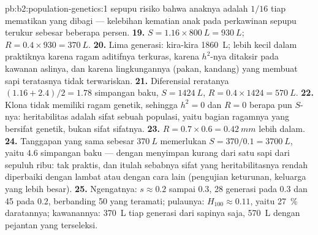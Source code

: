 \begin{solution}{pb:b2:population-genetics:1}
sepupu risiko bahwa anaknya  adalah $1/16$ tiap  mematikan
yang dibagi --- kelebihan kematian anak pada perkawinan sepupu terukur
sebesar beberapa persen.
\textbf{19.} $S = 1.16\times \qty{800}{L} = \qty{930}{L}$; $R = 0.4\times
930 = \qty{370}{L}$.
\textbf{20.} Lima generasi: kira-kira \qty{1860}{L}; lebih kecil dalam
praktiknya karena ragam aditifnya terkuras, karena $h^{2}$-nya ditaksir
pada kawanan aslinya, dan karena lingkungannya (pakan, kandang) yang
membuat sapi teratasnya tidak terwariskan.
\textbf{21.} Diferensial reratanya $(1.16 + 2.4)/2 = 1.78$ simpangan
baku, $S = \qty{1424}{L}$, $R = 0.4\times 1424 = \qty{570}{L}$.
\textbf{22.} Klona tidak memiliki ragam genetik, sehingga $h^{2} = 0$
dan $R =
0$ berapa pun $S$-nya: heritabilitas adalah sifat sebuah
populasi, yaitu bagian ragamnya yang bersifat genetik, bukan sifat
sifatnya.
\textbf{23.} $R = 0.7\times 0.6 = \qty{0.42}{mm}$ lebih dalam.
\textbf{24.} Tanggapan yang sama sebesar $\qty{370}{L}$ memerlukan $S = 370/0.1 =
\qty{3700}{L}$, yaitu $4.6$ simpangan baku --- dengan
menyimpan kurang dari satu sapi dari sepuluh ribu: tak praktis, dan
itulah sebabnya sifat yang heritabilitasnya rendah diperbaiki dengan
lambat atau dengan cara lain (pengujian keturunan, keluarga yang lebih
besar).
\textbf{25.} Ngengatnya: $s \approx 0.2$ sampai $0.3$, 28 generasi pada
$0.3$ dan 45 pada $0.2$, berbanding 50 yang teramati; pulaunya:
$H_{100} \approx 0.11$, yaitu \qty{27}{\%} daratannya; kawanannya:
\qty{370}{L} tiap generasi dari sapinya saja, \qty{570}{L} dengan
pejantan yang terseleksi.
\end{solution}
